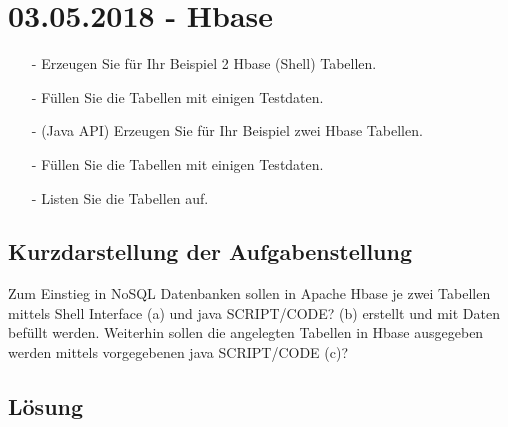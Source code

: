\section{03.05.2018 - Hbase}
\begin{itemize}
\item[-] Erzeugen Sie für Ihr Beispiel 2 Hbase (Shell) Tabellen.
\item[-] Füllen Sie die Tabellen mit einigen Testdaten.
\item[-] (Java API) Erzeugen Sie für Ihr Beispiel zwei Hbase Tabellen.
\item[-] Füllen Sie die Tabellen mit einigen Testdaten.
\item[-] Listen Sie die Tabellen auf.
\end{itemize}
\subsection*{Kurzdarstellung der Aufgabenstellung}
Zum Einstieg in NoSQL Datenbanken sollen in Apache Hbase je zwei Tabellen mittels Shell Interface (a) und java SCRIPT/CODE? (b) erstellt und mit Daten befüllt werden. Weiterhin sollen die angelegten Tabellen in Hbase ausgegeben werden mittels vorgegebenen java SCRIPT/CODE (c)?
\subsection*{Lösung}


